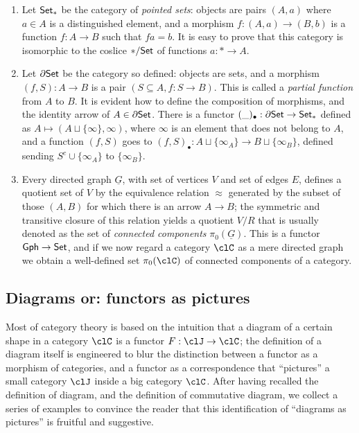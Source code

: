 \documentclass[11pt]{article}
\begin{document}
\begin{example}
\begin{enumerate}
		\item  Let $\mathsf{Set}_*$ be the category of \emph{pointed sets}: objects are pairs $(A,a)$ where $a\in A$ is a distinguished element, and a morphism $f : (A,a) \to (B,b)$ is a function $f :A\to B$ such that $fa=b$. It is easy to prove that this category is isomorphic to the coslice  $*/\mathsf{Set}$ of functions $a : * \to A$.
		\item  Let $\partial\mathsf{Set}$ be the category so defined: objects are sets, and a morphism $(f,S) : A \to B$ is  a pair $(S \subseteq A, f : S \to B)$. This is called a \emph{partial function} from $A$ to $B$. It is evident how to define the composition of morphisms, and the identity arrow of $A \in\partial\mathsf{Set}$. There is a functor $(\_)_\bullet : \partial\mathsf{Set} \to \mathsf{Set}_*$ defined as $A\mapsto (A\sqcup \{\infty\}, \infty)$, where $\infty$ is an element that does not belong to $A$, and a function $(f,S)$ goes to $(f,S)_\bullet : A\sqcup \{\infty_A\} \to B\sqcup\{\infty_B\}$, defined sending $S^c\cup \{\infty_A\}$ to $\{\infty_B\}$.
		\item  Every directed graph $\underline G$, with set of vertices $V$ and set of edges $E$, defines a quotient set of $V$ by the equivalence relation $\approx$ generated by the subset of those $(A, B)$ for which there is an arrow $A\to B$; the symmetric and transitive closure of this relation yields a quotient $V/R$ that is usually denoted as the set of \emph{connected components} $\pi_0(\underline G)$. This is a functor $\mathsf{Gph} \to \mathsf{Set}$, and if we now regard a category $\clC$ as a mere directed graph we obtain a well-defined set $\pi_0(\clC)$ of connected components of a category.
	\end{enumerate}
\end{example}
\subsection{Diagrams or: functors as pictures}
Most of category theory is based on the intuition that a diagram of a certain shape in a category $\clC$ is a functor $F : \clJ \to \clC$; the definition of a diagram itself is engineered to blur the distinction between a functor as a morphism of categories, and a functor as a correspondence that ``pictures'' a small category $\clJ$ inside a big category $\clC$. After having recalled the definition of diagram, and the definition of commutative diagram, we collect a series of examples to convince the reader that this identification of ``diagrams as pictures'' is fruitful and suggestive.
\end{document}
